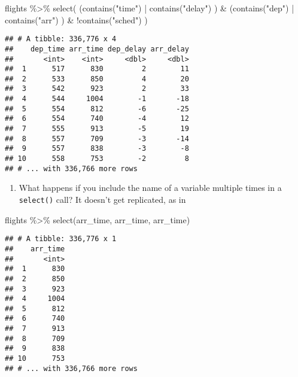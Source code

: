 \documentclass[
]{article}
\newenvironment{Shaded}{\begin{snugshade}}{\end{snugshade}}
\newcommand{\FunctionTok}[1]{\textcolor[rgb]{0.00,0.00,0.00}{#1}}
\newcommand{\NormalTok}[1]{#1}
\newcommand{\SpecialCharTok}[1]{\textcolor[rgb]{0.00,0.00,0.00}{#1}}
\newcommand{\StringTok}[1]{\textcolor[rgb]{0.31,0.60,0.02}{#1}}
\providecommand{\tightlist}{%
  \setlength{\itemsep}{0pt}\setlength{\parskip}{0pt}}
\begin{document}
\begin{Shaded}
\begin{Highlighting}[]
\NormalTok{flights }\SpecialCharTok{\%\textgreater{}\%} \FunctionTok{select}\NormalTok{( (}\FunctionTok{contains}\NormalTok{(}\StringTok{"time"}\NormalTok{) }\SpecialCharTok{|} \FunctionTok{contains}\NormalTok{(}\StringTok{"delay"}\NormalTok{) ) }\SpecialCharTok{\&}
\NormalTok{                    (}\FunctionTok{contains}\NormalTok{(}\StringTok{"dep"}\NormalTok{)  }\SpecialCharTok{|} \FunctionTok{contains}\NormalTok{(}\StringTok{"arr"}\NormalTok{)   ) }\SpecialCharTok{\&} 
                    \SpecialCharTok{!}\FunctionTok{contains}\NormalTok{(}\StringTok{"sched"}\NormalTok{)                      )}
\end{Highlighting}
\end{Shaded}

\begin{verbatim}
## # A tibble: 336,776 x 4
##    dep_time arr_time dep_delay arr_delay
##       <int>    <int>     <dbl>     <dbl>
##  1      517      830         2        11
##  2      533      850         4        20
##  3      542      923         2        33
##  4      544     1004        -1       -18
##  5      554      812        -6       -25
##  6      554      740        -4        12
##  7      555      913        -5        19
##  8      557      709        -3       -14
##  9      557      838        -3        -8
## 10      558      753        -2         8
## # ... with 336,766 more rows
\end{verbatim}

\begin{enumerate}
\def\labelenumi{\arabic{enumi}.}
\setcounter{enumi}{1}
\tightlist
\item
  What happens if you include the name of a variable multiple times in a
  \texttt{select()} call? It doesn't get replicated, as in
\end{enumerate}

\begin{Shaded}
\begin{Highlighting}[]
\NormalTok{flights }\SpecialCharTok{\%\textgreater{}\%} \FunctionTok{select}\NormalTok{(arr\_time, arr\_time, arr\_time)}
\end{Highlighting}
\end{Shaded}

\begin{verbatim}
## # A tibble: 336,776 x 1
##    arr_time
##       <int>
##  1      830
##  2      850
##  3      923
##  4     1004
##  5      812
##  6      740
##  7      913
##  8      709
##  9      838
## 10      753
## # ... with 336,766 more rows
\end{verbatim}
\end{document}
